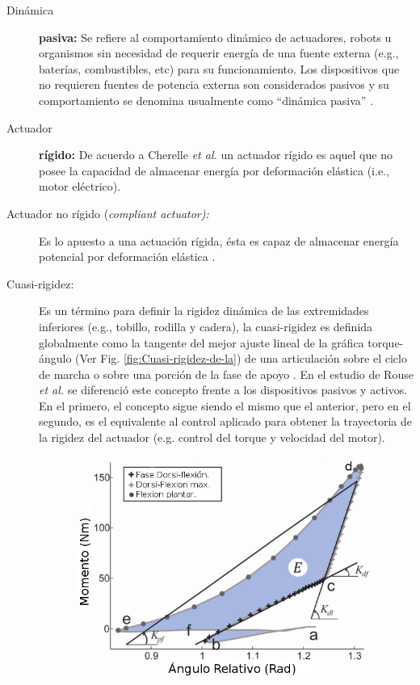 \documentclass[12pt,english]{article}
\begin{document}
\begin{description}
\item [{Dinámica}] \textbf{pasiva:} Se refiere al comportamiento dinámico
de actuadores, robots u organismos sin necesidad de requerir energía
de una fuente externa (e.g., baterías, combustibles, etc) para su
funcionamiento. Los dispositivos que no requieren fuentes de potencia
externa son considerados pasivos y su comportamiento se denomina usualmente
como ``dinámica pasiva'' \cite{Wisse2006}. 
\item [{Actuador}] \textbf{rígido:} De acuerdo a Cherelle \emph{et al.}
\cite{Cherelle2014a} un actuador rígido es aquel que no posee la
capacidad de almacenar energía por deformación elástica (i.e., motor
eléctrico).
\item [{Actuador no rígido (\it{compliant actuator}):}] Es lo
apuesto a una actuación rígida, ésta es capaz de almacenar energía
potencial por deformación elástica \cite{Cherelle2014a}.
\item [{Cuasi-rigidez:}] Es un término para definir la rigidez dinámica
de las extremidades inferiores (e.g., tobillo, rodilla y cadera),
la cuasi-rigidez es definida globalmente como la tangente del mejor
ajuste lineal de la gráfica torque-ángulo (Ver Fig. \ref{fig:Cuasi-rigidez-de-la}) de una articulación sobre el ciclo de marcha o sobre una porción de la fase de apoyo \cite{Shamaei2013}
. En el estudio de Rouse
\emph{et al.} \cite{Rouse2013a} se diferenció este concepto frente
a los dispositivos pasivos y activos. En el primero, el concepto sigue
siendo el mismo que el anterior, pero en el segundo, es el equivalente
al control aplicado para obtener la trayectoria de la rigidez del
actuador (e.g. control del torque y velocidad del motor).


\begin{figure}
\begin{centering}
\includegraphics[scale=0.5]{quasirigidez}
\par\end{centering}


\end{figure}
\end{description}
\end{document}
